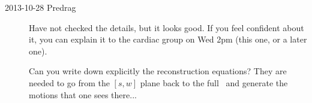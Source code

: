 \begin{description}
\item[2013-10-28 Predrag] Have not checked the details, but it looks
good. If you feel confident about it, you can explain it to the
cardiac group on Wed 2pm (this one, or a later one).

Can you write down explicitly the
{reconstruction equations}? They are needed to go from the $[s,w]$ plane
back to the full \statesp\ and generate the motions that one sees
there...



\end{description}
\renewcommand{\ssp}{a}
